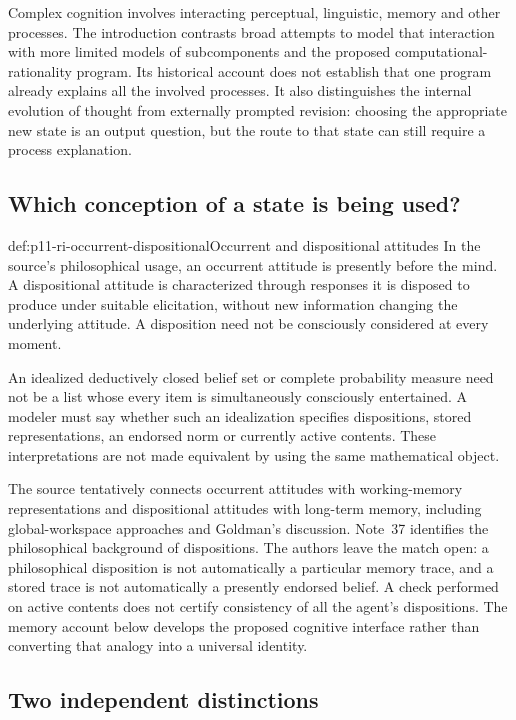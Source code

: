 Complex cognition involves interacting perceptual, linguistic, memory
and other processes. The introduction contrasts broad attempts to
model that interaction with more limited models of subcomponents and
the proposed computational-rationality program. Its historical account
does not establish that one program already explains all the involved
processes. It also distinguishes the internal evolution of thought
from externally prompted revision: choosing the appropriate new state
is an output question, but the route to that state can still require
a process explanation.

\subsection{Which conception of a state is being used?}

\begin{hbdefinition}{def:p11-ri-occurrent-dispositional}{Occurrent and dispositional attitudes}
In the source's philosophical usage, an occurrent attitude is presently
before the mind. A dispositional attitude is characterized through
responses it is disposed to produce under suitable elicitation, without
new information changing the underlying attitude. A disposition need
not be consciously considered at every moment.

An idealized deductively closed belief set or complete probability
measure need not be a list whose every item is simultaneously consciously
entertained. A modeler must say whether such an idealization specifies
dispositions, stored representations, an endorsed norm or currently
active contents. These interpretations are not made equivalent by
using the same mathematical object.
\end{hbdefinition}

The source tentatively connects occurrent attitudes with working-memory
representations and dispositional attitudes with long-term memory,
including global-workspace approaches and Goldman's discussion.
Note~37 identifies the philosophical background of dispositions.
The authors leave the match open: a philosophical disposition is not
automatically a particular memory trace, and a stored trace is not
automatically a presently endorsed belief. A check performed on active
contents does not certify consistency of all the agent's dispositions.
The memory account below develops the proposed cognitive interface
rather than converting that analogy into a universal identity.

\subsection{Two independent distinctions}

